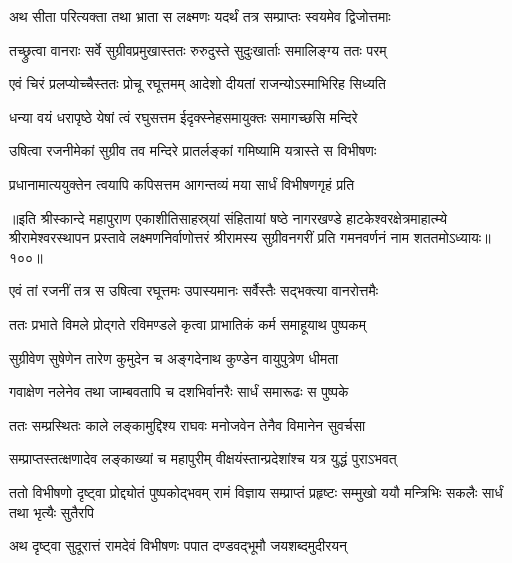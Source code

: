 \twolineshloka
{अथ सीता परित्यक्ता तथा भ्राता स लक्ष्मणः}
{यदर्थं तत्र सम्प्राप्तः स्वयमेव द्विजोत्तमाः}%

\twolineshloka
{तच्छ्रुत्वा वानराः सर्वे सुग्रीवप्रमुखास्ततः}
{रुरुदुस्ते सुदुःखार्ताः समालिङ्ग्य ततः परम्}%

\twolineshloka
{एवं चिरं प्रलप्योच्चैस्ततः प्रोचू रघूत्तमम्}
{आदेशो दीयतां राजन्योऽस्माभिरिह सिध्यति}%

\twolineshloka
{धन्या वयं धरापृष्ठे येषां त्वं रघुसत्तम}
{ईदृक्स्नेहसमायुक्तः समागच्छसि मन्दिरे}%


\twolineshloka
{उषित्वा रजनीमेकां सुग्रीव तव मन्दिरे} 
{प्रातर्लङ्कां गमिष्यामि यत्रास्ते स विभीषणः}%

\twolineshloka
{प्रधानामात्ययुक्तेन त्वयापि कपिसत्तम}
{आगन्तव्यं मया सार्धं विभीषणगृहं प्रति}%

॥इति श्रीस्कान्दे महापुराण एकाशीतिसाहस्र्यां संहितायां षष्ठे नागरखण्डे हाटकेश्वरक्षेत्रमाहात्म्ये श्रीरामेश्वरस्थापन प्रस्तावे लक्ष्मणनिर्वाणोत्तरं श्रीरामस्य सुग्रीवनगरीं प्रति गमनवर्णनं नाम शततमोऽध्यायः॥१००॥

\resetShloka


\twolineshloka
{एवं तां रजनीं तत्र स उषित्वा रघूत्तमः}
{उपास्यमानः सर्वैस्तैः सद्भक्त्या वानरोत्तमैः}%

\twolineshloka
{ततः प्रभाते विमले प्रोद्गते रविमण्डले}
{कृत्वा प्राभातिकं कर्म समाहूयाथ पुष्पकम्}%

\twolineshloka
{सुग्रीवेण सुषेणेन तारेण कुमुदेन च}
{अङ्गदेनाथ कुण्डेन वायुपुत्रेण धीमता}%

\twolineshloka
{गवाक्षेण नलेनेव तथा जाम्बवतापि च}
{दशभिर्वानरैः सार्धं समारूढः स पुष्पके}%

\twolineshloka
{ततः सम्प्रस्थितः काले लङ्कामुद्दिश्य राघवः}
{मनोजवेन तेनैव विमानेन सुवर्चसा}%

\twolineshloka
{सम्प्राप्तस्तत्क्षणादेव लङ्काख्यां च महापुरीम्}
{वीक्षयंस्तान्प्रदेशांश्च यत्र युद्धं पुराऽभवत्}%

\threelineshloka
{ततो विभीषणो दृष्ट्वा प्रोद्द्योतं पुष्पकोद्भवम्}
{रामं विज्ञाय सम्प्राप्तं प्रहृष्टः सम्मुखो ययौ}
{मन्त्रिभिः सकलैः सार्धं तथा भृत्यैः सुतैरपि}%

\twolineshloka
{अथ दृष्ट्वा सुदूरात्तं रामदेवं विभीषणः}
{पपात दण्डवद्भूमौ जयशब्दमुदीरयन्}%

